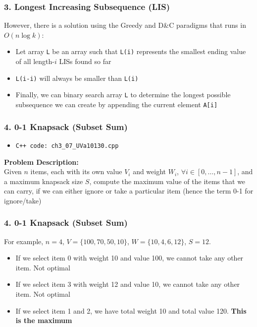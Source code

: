 \documentclass{beamer}
\begin{document}
\begin{frame}[fragile]
\frametitle{3. Longest Increasing Subsequence (LIS)}

However, there is a solution using the Greedy and D\&C paradigms that runs in $O(n \log k)$:

\begin{itemize}
    \item Let array \verb|L| be an array such that \verb|L(i)| represents the smallest ending value of all length-$i$ LISs found so far
   	
	\pause
    \item \verb|L(i-i)| will always be smaller than \verb|L(i)|
    
   	\pause 
    \item Finally, we can binary search array \verb|L| to determine the longest possible subsequence we can create by appending the current element \verb|A[i]|
\end{itemize}

\end{frame}

\begin{frame}[fragile]
\frametitle{4. 0-1 Knapsack (Subset Sum)}

\begin{itemize}
    \item \color{red}\verb|C++ code: ch3_07_UVa10130.cpp|\color{black}
\end{itemize} 

\vspace{0.3cm}

\color{red}\textbf{Problem Description: }\color{black} \\ 

Given $n$ items, each with its own value $V_i$ and weight $W_i$, $\forall i \in [0,\ldots,n-1]$, and a maximum knapsack size $S$, compute the maximum value of the items that we can carry, if we can either ignore or take a particular item (hence the term 0-1 for ignore/take)

\end{frame}

\begin{frame}[fragile]
\frametitle{4. 0-1 Knapsack (Subset Sum)}

For example, $n = 4$, $V = \{100,70,50,10\}$, $W = \{10,4,6,12\}$, $S = 12$.

\begin{itemize}
    \item If we select item 0 with weight 10 and value 100, we cannot take any other item. Not optimal
    \item If we select item 3 with weight 12 and value 10, we cannot take any other item. Not optimal
    \item If we select item 1 and 2, we have total weight 10 and total value 120. \textbf{This is the maximum}
\end{itemize}

\end{frame}
\end{document}
